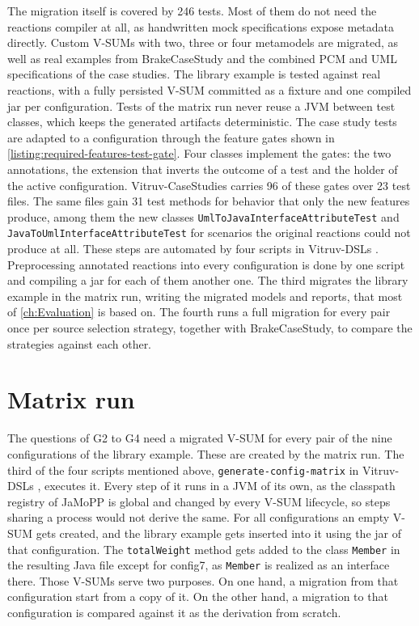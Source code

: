 The migration itself is covered by 246 tests.
Most of them do not need the reactions compiler at all, as handwritten mock specifications expose metadata directly.
Custom V-SUMs with two, three or four metamodels are migrated, as well as real examples from BrakeCaseStudy and the combined PCM and UML specifications of the case studies.
The library example is tested against real reactions, with a fully persisted V-SUM committed as a fixture and one compiled jar per configuration.
Tests of the matrix run never reuse a JVM between test classes, which keeps the generated artifacts deterministic.
The case study tests are adapted to a configuration through the feature gates shown in \autoref{listing:required-features-test-gate}.
Four classes implement the gates: the two annotations, the extension that inverts the outcome of a test and the holder of the active configuration.
Vitruv-CaseStudies \cite{vitruv-casestudies-fork} carries 96 of these gates over 23 test files.
The same files gain 31 test methods for behavior that only the new features produce, among them the new classes \texttt{UmlToJavaInterfaceAttributeTest} and \texttt{JavaToUmlInterfaceAttributeTest} for scenarios the original reactions could not produce at all.
These steps are automated by four scripts in Vitruv-DSLs \cite{vitruv-dsls-fork}.
Preprocessing annotated reactions into every configuration is done by one script and compiling a jar for each of them another one.
The third migrates the library example in the matrix run, writing the migrated models and reports, that most of \autoref{ch:Evaluation} is based on.
The fourth runs a full migration for every pair once per source selection strategy, together with BrakeCaseStudy, to compare the strategies against each other.

\section{Matrix run}
\label{sec:Implementation:MatrixRun}

The questions of G2 to G4 need a migrated V-SUM for every pair of the nine configurations of the library example.
These are created by the matrix run.
The third of the four scripts mentioned above, \texttt{generate-config-matrix} in Vitruv-DSLs \cite{vitruv-dsls-fork}, executes it.
Every step of it runs in a JVM of its own, as the classpath registry of JaMoPP is global \cite{heidenreich2009closing} and changed by every V-SUM lifecycle, so steps sharing a process would not derive the same.
For all configurations an empty V-SUM gets created, and the library example gets inserted into it using the jar of that configuration.
The \texttt{totalWeight} method gets added to the class \texttt{Member} in the resulting Java file except for config7, as \texttt{Member} is realized as an interface there.
Those V-SUMs serve two purposes.
On one hand, a migration from that configuration start from a copy of it.
On the other hand, a migration to that configuration is compared against it as the derivation from scratch.

